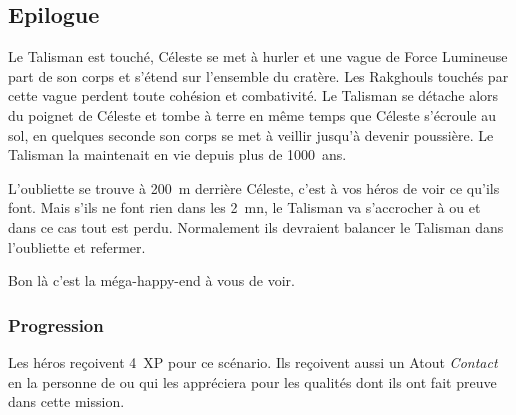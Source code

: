 \subsection{Epilogue}
Le Talisman est touché, Céleste se met à hurler et une vague de Force Lumineuse part de son corps et s’étend sur l’ensemble du cratère. Les Rakghouls touchés par cette vague perdent toute cohésion et combativité. Le Talisman se détache alors du poignet de Céleste et tombe à terre en même temps que Céleste s’écroule au sol, en quelques seconde son corps se met à veillir jusqu’à devenir poussière. Le Talisman la maintenait en vie depuis plus de 1000~ans.

L’oubliette se trouve à 200~m derrière Céleste, c’est à vos héros de voir ce qu’ils font. Mais s’ils ne font rien dans les 2~mn, le Talisman va s’accrocher à  ou  et dans ce cas tout est perdu. Normalement ils devraient balancer le Talisman dans l’oubliette et refermer.

Bon là c’est la méga-happy-end à vous de voir.

\subsubsection{Progression}
Les héros reçoivent 4~XP pour ce scénario. Ils reçoivent aussi un Atout \textit{Contact} en la personne de  ou  qui les appréciera pour les qualités dont ils ont fait preuve dans cette mission.